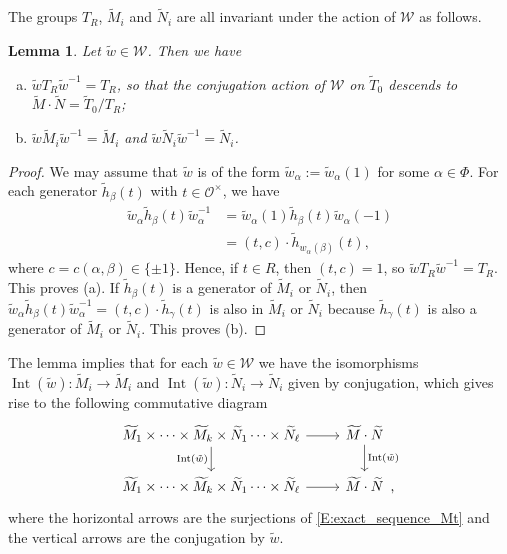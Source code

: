 \documentclass[10pt, letterpaper]{amsart}
\theoremstyle{plain}
\newtheorem{Lem}[equation]{Lemma}
\theoremstyle{definition}
\numberwithin{equation}{section}
\newcommand{\wt}{\tilde{w}}
\newcommand{\htt}{\tilde{h}}
\newcommand{\wta}{\tilde{w}_{\alpha}}
\newcommand{\htb}{\tilde{h}_{\beta}}
\newcommand{\Mt}{\widetilde{M}}
\newcommand{\Nt}{\widetilde{N}}
\newcommand{\Tt}{\widetilde{T}}
\newcommand{\Int}{\operatorname{Int}}
\newcommand{\Ocal}{\mathcal{O}}
\newcommand{\Wcal}{\mathcal{W}}
\begin{document}


 
The groups $T_{R}$, $\Mt_i$ and $\Nt_i$ are all invariant under the action of $\Wcal$ as follows.
\begin{Lem}\label{L:action_of_W_on_T(O)}
Let $\wt\in\Wcal$.  Then we have
\begin{enumerate}[(a)]
\item $\wt T_{R}\wt^{-1}=T_{R}$, so that the conjugation action of $\Wcal$ on $\Tt_{0}$ descends to $\Mt\cdot\Nt=\Tt_{0}\slash T_{R}$;
\item $\wt\Mt_i\wt^{-1}=\Mt_i$ and $\wt\Nt_i\wt^{-1}=\Nt_i$.
\end{enumerate}
\end{Lem}
\begin{proof}
We may assume that $\wt$ is of the form $\wta:=\wt_{\alpha}(1)$ for some $\alpha\in\Phi$. For each generator $\htb(t)$ with $t\in\Ocal^\times$, we have
\begin{align*}
\wta\htb(t)\wta^{-1}&=\wta(1)\htb(t)\wta(-1)\\
&=(t, c)\cdot\htt_{w_{\alpha}(\beta)}(t),
\end{align*}
where $c=c(\alpha, \beta)\in\{\pm 1\}$. Hence, if $t\in R$, then $(t, c)=1$, so $\wt T_{R}\wt^{-1}=T_{R}$. This proves (a). If $\htb(t)$ is a generator of $\Mt_i$ or $\Nt_i$, then $\wta\htb(t)\wta^{-1}=(t, c)\cdot\htt_{\gamma}(t)$ is also in $\Mt_i$ or $\Nt_i$ because $\htt_{\gamma}(t)$ is also a generator of $\Mt_i$ or $\Nt_i$. This proves (b).
\end{proof}

The lemma implies that for each $\wt\in\Wcal$ we have the isomorphisms $\Int(\wt):\Mt_i\to\Mt_i$ and $\Int(\wt):\Nt_i\to\Nt_i$ given by conjugation, which gives rise to the following commutative diagram
\begin{equation}\label{D:commutativity_of_Weyl_action}
\begin{tikzcd}
\Mt_1\times\cdots\times\Mt_k\times\Nt_1\cdots\times\Nt_\ell \ar[d, "\Int(\wt)"']\ar[r]&\Mt\cdot\Nt\ar[d, "\Int(\wt)"]\\
\Mt_1\times\cdots\times\Mt_k\times\Nt_1\cdots\times\Nt_\ell\ar[r]&\Mt\cdot\Nt
\rlap{\, ,}
\end{tikzcd}
\end{equation}
where the horizontal arrows are the surjections of \eqref{E:exact_sequence_Mt} and the vertical arrows are the conjugation by $\wt$.
\end{document}
